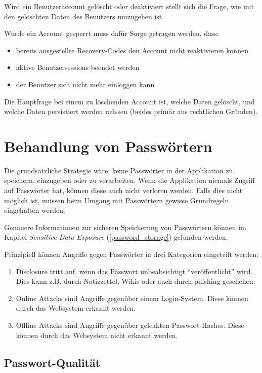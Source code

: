 Wird ein Benutzeraccount gelöscht oder deaktiviert stellt sich die Frage, wie mit den gelöschten Daten des Benutzers umzugehen ist.

Wurde ein Account gesperrt muss dafür Sorge getragen werden, dass:

\begin{itemize}
	\item bereits ausgestellte Recovery-Codes den Account nicht reaktivieren können
	\item aktive Benutzersessions beendet werden
	\item der Benutzer sich nicht mehr einloggen kann
\end{itemize}

Die Hauptfrage bei einem zu löschenden Account ist, welche Daten gelöscht, und welche Daten persistiert werden müssen (beides primär aus rechtlichen Gründen).

\section{Behandlung von Passwörtern}

Die grundsätzliche Strategie wäre, keine Passwörter in der Applikation zu speichern, einzugeben oder zu verarbeiten. Wenn die Applikation niemals Zugriff auf Passwörter hat, können diese auch nicht verloren werden. Falls dies nicht möglich ist, müssen beim Umgang mit Passwörtern gewisse Grundregeln eingehalten werden.

Genauere Informationen zur sicheren Speicherung von Passwörtern können im Kapitel \textit{Sensitive Data Exposure} (\ref{password_storage}) gefunden werden.

Prinzipiell können Angriffe gegen Passwörter in drei Kategorien eingeteilt werden:

\begin{enumerate}
	\item Disclosure tritt auf, wenn das Passwort unbeabsichtigt ``veröffentlicht'' wird. Dies kann z.B. durch Notizzettel, Wikis oder auch durch phishing geschehen.
	\item Online Attacks sind Angriffe gegenüber einem Login-System. Diese können durch das Websystem erkannt werden.
	\item Offline Attacks sind Angriffe gegenüber geleakten Passwort-Hashes. Diese können durch das Websystem nicht erkannt werden.
\end{enumerate}

\subsection{Passwort-Qualität}

